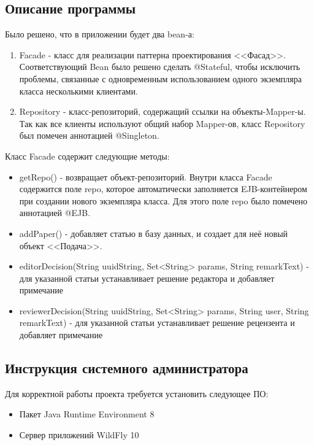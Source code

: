 \subsection{Описание программы}

Было решено, что в приложении будет два bean-а:
\begin{enumerate}
\item Facade - класс для реализации паттерна проектирования <<Фасад>>. Соответствующий Bean было решено сделать @Stateful, чтобы исключить проблемы, связанные с одновременным использованием одного экземпляра класса несколькими клиентами.
\item Repository - класс-репозиторий, содержащий ссылки на объекты-Mapper-ы. Так как все клиенты используют общий набор Mapper-ов, класс Repository был помечен аннотацией @Singleton.
\end{enumerate}

Класс Facade содержит следующие методы:

\begin{itemize}
\item getRepo() - возвращает объект-репозиторий. Внутри класса Facade содержится поле repo, которое автоматически заполняется EJB-контейнером при создании нового экземпляра класса. Для этого поле repo было помечено аннотацией @EJB.
\item addPaper() - добавляет статью в базу данных, и создает для неё новый объект <<Подача>>.
\item editorDecision(String uuidString, Set<String> params, String remarkText) - для указанной статьи устанавливает решение редактора и добавляет примечание
\item reviewerDecision(String uuidString, Set<String> params, String user, String remarkText) - для указанной статьи устанавливает решение рецензента и добавляет примечание
\end{itemize}

\subsection{Инструкция системного администратора}

Для корректной работы проекта требуется установить следующее ПО:

\begin{itemize}
\item Пакет Java Runtime Environment 8
\item Сервер приложений WildFly 10
\end{itemize}

